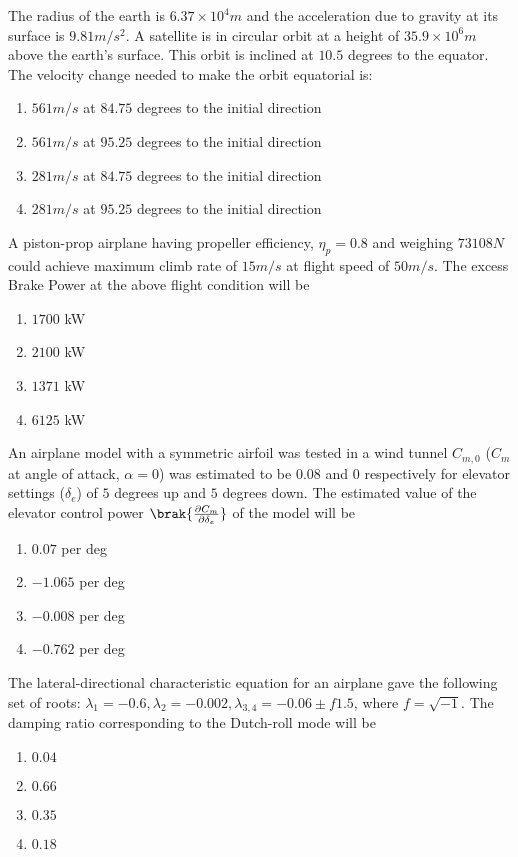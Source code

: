 	\item The radius of the earth is $6.37 \times 10^4 m$ and the acceleration due to gravity at its surface is $9.81 m / s^2$. A satellite is in circular orbit at a height of $35.9\times 10^6 m$ above the earth's surface. This orbit is inclined at $10.5$ degrees to the equator. The velocity change needed to make the orbit equatorial is:
		\begin{enumerate}
			\item $561 m / s$ at $84.75$ degrees to the initial direction
			\item $561 m / s$ at $95.25$ degrees to the initial direction
			\item $281 m / s$ at $84.75$ degrees to the initial direction
			\item $281 m / s$ at $95.25$ degrees to the initial direction
		\end{enumerate}

	\item A piston-prop airplane having propeller efficiency, $\eta_p = 0.8$ and weighing $73108 N$ could achieve maximum climb rate of $15m/s$ at flight speed of $50m/s$. The excess Brake Power  at the above flight condition will be
		\begin{enumerate}
			\item $1700$ kW
			\item $2100$ kW
			\item $1371$ kW
			\item $6125$ kW
		\end{enumerate}
	\item An airplane model with a symmetric airfoil was tested in a wind tunnel $C_{m,0}$ ($C_m$ at angle of attack, $\alpha = 0$) was estimated to be $0.08$ and $0$ respectively for elevator settings ($\delta _ e$) of $5$ degrees up and $5$ degrees down. The estimated value of the elevator control power $\brak{\frac{\partial C_m}{\partial \delta _ e}}$ of the model will be 
		\begin{enumerate}
			\item $0.07$ per deg
			\item $-1.065$ per deg
			\item $-0.008$ per deg
			\item $-0.762$ per deg
		\end{enumerate}

	\item The lateral-directional characteristic equation for an airplane gave the following set of roots: $\lambda _ 1 = -0.6, \lambda _ 2 = -0.002, \lambda _{3,4} = -0.06 \pm f1.5$, where $f = \sqrt{-1}$. The damping ratio corresponding to the Dutch-roll mode will be
		\begin{enumerate}
			\item $0.04$
			\item $0.66$
			\item $0.35$
			\item $0.18$
		\end{enumerate}

